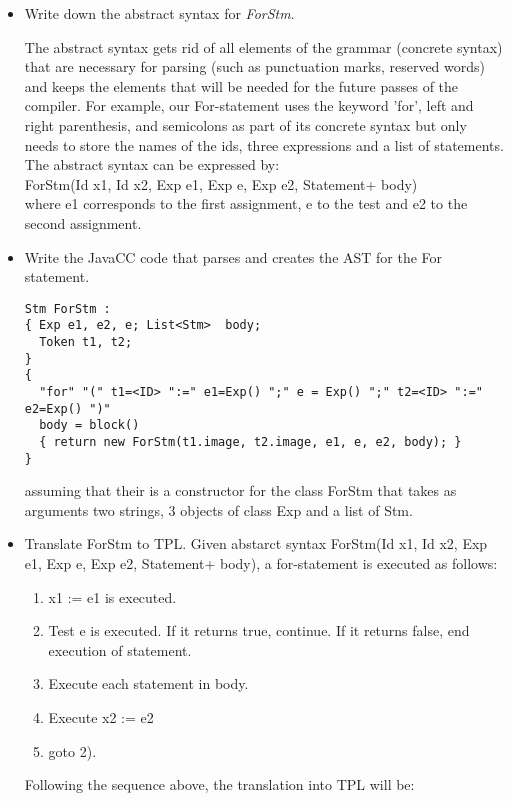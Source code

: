 \documentclass{article}
\begin{document}
\begin{itemize}
\item Write down the abstract syntax for \textit{ForStm}.

The abstract syntax gets rid of all elements of the grammar (concrete syntax) that are necessary for parsing (such as punctuation marks, reserved words) and keeps the elements that will be needed for the future passes of the compiler. For example, our For-statement uses the keyword 'for', left and right parenthesis, and semicolons as part of its concrete syntax but only needs to store the names of the ids, three expressions and a list of statements. The abstract syntax can be expressed by: \\

ForStm(Id x1, Id x2, Exp e1, Exp e, Exp e2, Statement+ body) \\

\noindent where e1 corresponds to the first assignment, e to the test and e2 to the second assignment.

\item Write the JavaCC code that parses and creates the AST for the For statement.

\begin{verbatim}
Stm ForStm :
{ Exp e1, e2, e; List<Stm>  body; 
  Token t1, t2;
}
{
  "for" "(" t1=<ID> ":=" e1=Exp() ";" e = Exp() ";" t2=<ID> ":=" e2=Exp() ")"
  body = block()
  { return new ForStm(t1.image, t2.image, e1, e, e2, body); }
}
\end{verbatim}

assuming that their is a constructor for the class ForStm that takes as arguments two strings, 3 objects of class Exp and a list of Stm.

\item Translate ForStm to TPL.
Given abstarct syntax ForStm(Id x1, Id x2, Exp e1, Exp e, Exp e2, Statement+ body), a for-statement is executed as follows:
\begin{enumerate}
\item x1 := e1 is executed.
\item Test e is executed. If it returns true, continue. If it returns false, end execution of statement.
\item Execute each statement in body.
\item Execute x2 := e2
\item goto 2).
\end{enumerate}

Following the sequence above, the translation into TPL will be:


\end{itemize}
\end{document}
